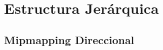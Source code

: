 \section{Estructura Jerárquica} %
\label{sec:estructura_jerarquica}


\subsection{Mipmapping Direccional} %
\label{sub:mipmapping_direccioanl}

